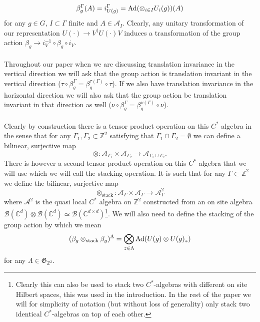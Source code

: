 \documentclass[12pt,a4paper,twoside]{article}
\let\originalleft\left
\let\originalright\right
\renewcommand{\left}{\mathopen{}\mathclose\bgroup\originalleft}
\renewcommand{\right}{\aftergroup\egroup\originalright}
\newcommand{\BB}{\mathcal B}
\newcommand{\ZZ}{\mathbb Z}
\newcommand{\CC}{\mathbb C}
\renewcommand{\AA}{\mathcal A}
\newcommand{\Ad}[1]{\textrm{Ad}\left(#1\right)}
\theoremstyle{definition}
\numberwithin{equation}{section}
\begin{document}
\begin{equation}
	\beta^\Gamma_g(A)=i_{U(g)}^\Gamma=\Ad{\otimes_{i\in I} U_i(g)}(A)
\end{equation}
for any $g\in G$, $I\subset\Gamma$ finite and $A\in\AA_I$. Clearly, any unitary transformation of our representation $U(\cdot)\rightarrow V^\dagger U(\cdot) V$ induces a transformation of the group action $\beta_g\rightarrow i_{V}^{-1}\circ\beta_g\circ i_V$.\\\\
Throughout our paper when we are discussing translation invariance in the vertical direction we will ask that the group action is translation invariant in the vertical direction ($\tau\circ\beta_g^\Gamma=\beta_g^{\tau(\Gamma)}\circ\tau$). If we also have translation invariance in the horizontal direction we will also ask that the group action be translation invariant in that direction as well ($\nu\circ\beta_g^\Gamma=\beta_g^{\nu(\Gamma)}\circ\nu$).\\\\
Clearly by construction there is a tensor product operation on this $C^*$ algebra in the sense that for any $\Gamma_1,\Gamma_2\subset\ZZ^2$ satisfying that $\Gamma_1\cap\Gamma_2=\emptyset$ we can define a bilinear, surjective map
\begin{equation}
	\otimes:\AA_{\Gamma_1}\times\AA_{\Gamma_2}\rightarrow \AA_{\Gamma_1\cup\Gamma_2}.
\end{equation}
There is however a second tensor product operation on this $C^*$ algebra that we will use which we will call the stacking operation. It is such that for any $\Gamma\subset\ZZ^2$ we define the bilinear, surjective map
\begin{equation}
	\otimes_{\text{stack}}:\AA_{\Gamma}\times\AA_{\Gamma}\rightarrow \AA^2_{\Gamma}
\end{equation}
where $\AA^2$ is the quasi local $C^*$ algebra on $\ZZ^2$ constructed from an on site algebra $\BB(\CC^d)\otimes\BB(\CC^d)\simeq \BB(\CC^{d\times d})$\footnote{Clearly this can also be used to stack two $C^*$-algebras with different on site Hilbert spaces, this was used in the introduction. In the rest of the paper we will for simplicity of notation (but without loss of generality) only stack two identical $C^*$-algebras on top of each other.}. We will also need to define the stacking of the group action by which we mean
\begin{equation}
	(\beta_g\otimes_{\text{stack}}\beta_g)^\Lambda=\bigotimes_{z\in\Lambda}\Ad{U(g)\otimes U(g)_z}
\end{equation}
for any $\Lambda\in\mathfrak{G}_{\ZZ^2}$.
\end{document}
